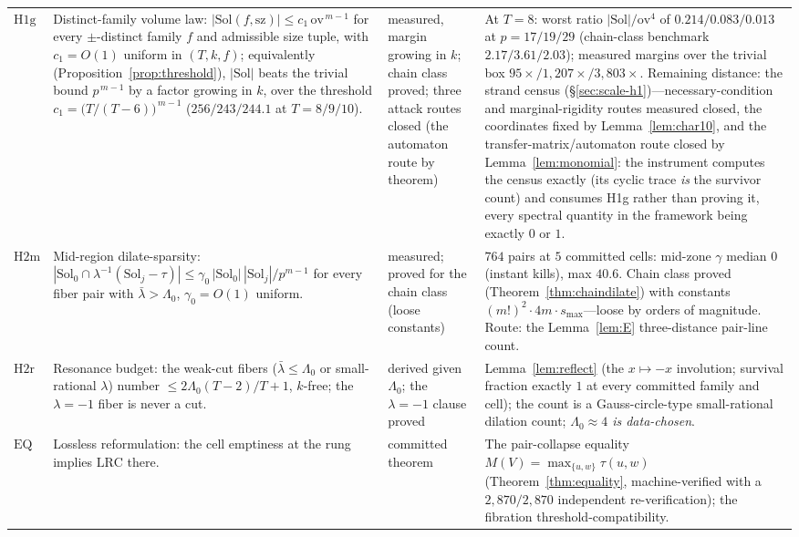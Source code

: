 {\begin{longtable}{@{}p{}p{}
                   p{}p{}@{}}
$\mathrm{H1g}$ &
Distinct-family volume law:
$|\mathrm{Sol}(f,\mathrm{sz})|\le c_1\,\mathrm{ov}^{\,m-1}$ for every
$\pm$-distinct family $f$ and admissible size tuple, with
$c_1=O(1)$ uniform in $(T,k,f)$; equivalently
(Proposition~\ref{prop:threshold}), $|\mathrm{Sol}|$ beats the trivial
bound $p^{\,m-1}$ by a factor growing in $k$, over the threshold
$c_1=\bigl(T/(T-6)\bigr)^{\,m-1}$ ($256/243/244.1$ at $T=8/9/10$). &
measured, margin growing in $k$; chain class proved; three attack
routes closed (the automaton route by theorem) &
At $T=8$: worst ratio $|\mathrm{Sol}|/\mathrm{ov}^4$ of
$0.214/0.083/0.013$ at $p=17/19/29$ (chain-class benchmark
$2.17/3.61/2.03$); measured margins over the trivial box
$95\times/1{,}207\times/3{,}803\times$. Remaining distance: the strand
census (\S\ref{sec:scale-h1})---necessary-condition and
marginal-rigidity routes measured closed, the coordinates fixed by
Lemma~\ref{lem:char10}, and the transfer-matrix/automaton route closed
by Lemma~\ref{lem:monomial}: the instrument computes the census exactly
(its cyclic trace \emph{is} the survivor count) and consumes H1g rather
than proving it, every spectral quantity in the framework being exactly
$0$ or $1$. \\
$\mathrm{H2m}$ &
Mid-region dilate-sparsity:
$|\mathrm{Sol}_0\cap\lambda^{-1}(\mathrm{Sol}_j-\tau)|\le
\gamma_0\,|\mathrm{Sol}_0|\,|\mathrm{Sol}_j|/p^{m-1}$ for every fiber
pair with $\bar\lambda>\Lambda_0$, $\gamma_0=O(1)$ uniform. &
measured; proved for the chain class (loose constants) &
$764$ pairs at $5$ committed cells: mid-zone $\gamma$ median $0$
(instant kills), max $40.6$. Chain class proved
(Theorem~\ref{thm:chaindilate}) with constants $(m!)^2\cdot 4m\cdot
s_{\max}$---loose by orders of magnitude. Route: the
Lemma~\ref{lem:E} three-distance pair-line count. \\
$\mathrm{H2r}$ &
Resonance budget: the weak-cut fibers ($\bar\lambda\le\Lambda_0$ or
small-rational $\lambda$) number
$\le 2\Lambda_0(T-2)/T+1$, $k$-free; the $\lambda=-1$ fiber is never a
cut. &
derived given $\Lambda_0$; the $\lambda=-1$ clause proved &
Lemma~\ref{lem:reflect} (the $x\mapsto-x$ involution; survival
fraction exactly $1$ at every committed family and cell); the count is
a Gauss-circle-type small-rational dilation count;
\emph{$\Lambda_0\approx 4$ is data-chosen}. \\
$\mathrm{EQ}$ &
Lossless reformulation: the cell emptiness at the rung implies
$\mathrm{LRC}$ there. &
committed theorem &
The pair-collapse equality
$M(V)=\max_{\{u,w\}}\tau(u,w)$ (Theorem~\ref{thm:equality},
machine-verified with a $2{,}870/2{,}870$ independent re-verification);
the fibration threshold-compatibility. \\
\end{longtable}
}

